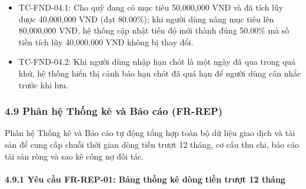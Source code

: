 \documentclass[11pt,a4paper]{article}
\providecommand{\tightlist}{
  \setlength{\itemsep}{0pt}\setlength{\parskip}{0pt}}
\begin{document}
\begin{itemize}
  \begin{itemize}
  \tightlist
  \item
    TC-FND-04.1: Cho quỹ đang có mục tiêu 50,000,000 VNĐ và đã tích lũy
    được 40,000,000 VNĐ (đạt 80.00\%); khi người dùng nâng mục tiêu lên
    80,000,000 VNĐ, hệ thống cập nhật tiến độ mới thành đúng 50.00\% mà
    số tiền tích lũy 40,000,000 VNĐ không bị thay đổi.
  \item
    TC-FND-04.2: Khi người dùng nhập hạn chót là một ngày đã qua trong
    quá khứ, hệ thống hiển thị cảnh báo hạn chót đã quá hạn để người
    dùng cân nhắc trước khi lưu.
  \end{itemize}
\end{itemize}

\subsubsection{4.9 Phân hệ Thống kê và Báo cáo
(FR-REP)}\label{49-phuxe2n-hux1ec7-thux1ed1ng-kuxea-vuxe0-buxe1o-cuxe1o-fr-rep}

Phân hệ Thống kê và Báo cáo tự động tổng hợp toàn bộ dữ liệu giao dịch
và tài sản để cung cấp chuỗi thời gian dòng tiền trượt 12 tháng, cơ cấu
thu chi, báo cáo tài sản ròng và sao kê công nợ đối tác.

\paragraph{4.9.1 Yêu cầu FR-REP-01: Bảng thống kê dòng tiền trượt 12
tháng}\label{491-yuxeau-cux1ea7u-fr-rep-01-bux1ea3ng-thux1ed1ng-kuxea-duxf2ng-tiux1ec1n-trux1b0ux1ee3t-12-thuxe1ng}
\end{document}
